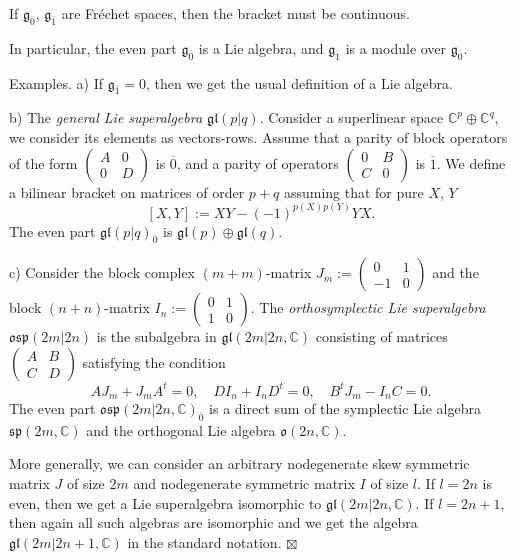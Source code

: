 \documentclass[]{amsart}
\def\frg{\mathfrak g}
\def\frl{\mathfrak l}
\def\fro{\mathfrak o}
\def\frp{\mathfrak p}
\def\frs{\mathfrak s}
\def\C {{\mathbb C }}
\def\ov{\overline}
\def\sm{\smallskip}
\def\0{{\ov 0}}
\def\1{{\ov 1}}
\def\osp{\mathfrak{osp}}
\begin{document}
 If $\frg_\0$, $\frg_\1$ are Fr\'echet spaces, then the bracket 
 must be continuous.
 
 \sm
 
 In particular, 
 the even part $\frg_\0$ is a Lie algebra,
and $\frg_\1$
 is a module over $\frg_\0$. 
 
 \sm

{\sc Examples.} 
a) If $\frg_\1=0$, then we get the usual definition of a Lie algebra.
 
\sm 
 
b) The {\it general Lie superalgebra $\frg\frl(p|q)$}.
 Consider a superlinear space $\C^p\oplus \C^q$,
 we consider its elements as vectors-rows. 
 Assume that a parity of block operators of the form
$\begin{pmatrix}A&0\\0&D\end{pmatrix}$ is $\0$, and a parity of operators
$\begin{pmatrix}0&B\\C&0 \end{pmatrix}$ is $\1$. We define a bilinear bracket
on matrices of order $p+q$
assuming that for pure $X$, $Y$
$$
[X,Y]:=X Y-(-1)^{p(X)p(Y)}YX.
$$
The even part $\frg\frl(p|q)_{\ov 0}$ is $\frg\frl(p)\oplus \frg\frl(q)$.

\sm

c) Consider the block complex $(m+m)$-matrix 
$J_m:=\begin{pmatrix}0&1\\-1&0\end{pmatrix}$
and the block $(n+n)$-matrix $I_n:=\begin{pmatrix}0&1\\1&0\end{pmatrix}$.
The {\it orthosymplectic Lie superalgebra} $\osp(2m|2n)$
 is the subalgebra
in $\frg\frl(2m|2n,\C)$ consisting of matrices 
$\begin{pmatrix}A&B\\C&D\end{pmatrix}$ satisfying the condition
$$
A J_m+J_m A^t=0,\quad D I_n+I_n D^t=0,\quad B^t J_m-I_n C=0.
$$
The even part $\osp(2m|2n,\C)_{\ov 0}$ is a direct sum 
of the symplectic Lie algebra $\frs\frp(2m,\C)$ and
the orthogonal Lie algebra $\fro(2n,\C)$.

More generally, we can consider an arbitrary nodegenerate
skew symmetric matrix $J$ of size $2m$ and nodegenerate
symmetric matrix $I$ of size $l$. If $l=2n$ is even, then we get a
 Lie superalgebra isomorphic to $\frg\frl(2m|2n,\C)$. If $l=2n+1$,
 then again
 all such algebras are isomorphic and we get the algebra
 $\frg\frl(2m|2n+1,\C)$
 in the standard notation.
\hfill $\boxtimes$
\end{document}
